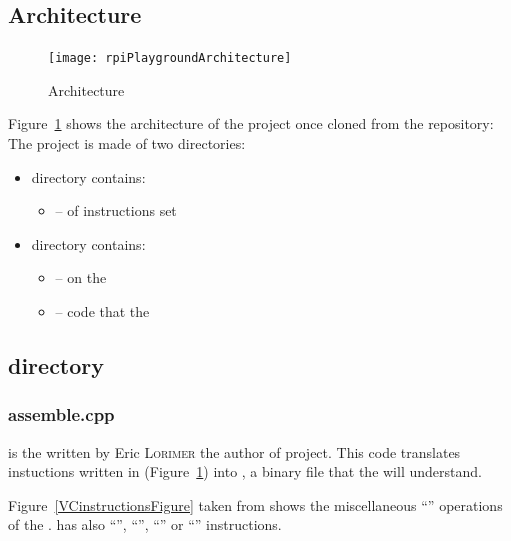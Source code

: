 \subsection{ Architecture}

\begin{figure}[!htbp]
	\centering
	\texttt{[image: rpiPlaygroundArchitecture]}
	\caption{ Architecture}
	\label{rpiPlaygroundFigure}
\end{figure}
\FloatBarrier

Figure~\ref{rpiPlaygroundFigure} shows the architecture of the  project once cloned from the  repository: 
The project is made of two directories:
\begin{itemize}
\item {} directory contains:
	\begin{itemize}
		\item {} --  of \vc{} instructions set
	\end{itemize}
\item {} directory contains:
	\begin{itemize}
		\item {} --  on the \vc
		\item {} -- code that  the \vc
	\end{itemize}
\end{itemize}



\subsection{ directory}


\subsubsection{assemble.cpp}

 is the  written by Eric \textsc{Lorimer} the author of  project. This code translates instuctions written in  (Figure~\ref{rpiPlaygroundFigure}) into , a binary file that the \vc{} will understand.

Figure~\ref{VCinstructionsFigure} taken from \parencite{refVC} shows the miscellaneous \enquote{} operations of the \qpu. \vc{} has also \enquote{}, \enquote{}, \enquote{} or \enquote{} instructions.

